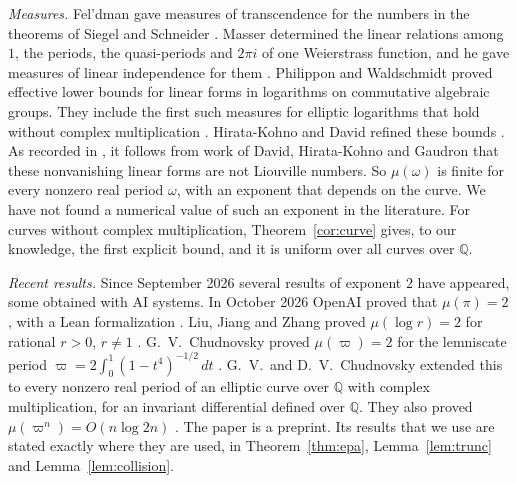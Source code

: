 \documentclass[11pt]{amsart}
\theoremstyle{definition}
\theoremstyle{remark}
\numberwithin{equation}{section}
\newcommand{\Q}{\mathbb Q}
\newcommand{\CM}{\cite{ChudnovskyChudnovsky26}}
\begin{document}
\emph{Measures.} Fel'dman gave measures of transcendence for the numbers in the theorems of Siegel and Schneider
\cite{Feldman51,Feldman74}. Masser determined the linear relations among $1$, the periods, the quasi-periods and
$2\pi i$ of one Weierstrass function, and he gave measures of linear independence for them \cite{Masser75}.
Philippon and Waldschmidt proved effective lower bounds for linear forms in logarithms on commutative algebraic
groups. They include the first such measures for elliptic logarithms that hold without complex multiplication
\cite{PhilipponWaldschmidt88,PhilipponWaldschmidt89}. Hirata-Kohno and David refined these bounds
\cite{HirataKohno90,HirataKohno91,David95}. As recorded in \cite[Section~4.3]{Waldschmidt08}, it follows from
work of David, Hirata-Kohno and Gaudron that these nonvanishing linear forms are not Liouville numbers. So
$\mu(\omega)$ is finite for every nonzero real period $\omega$, with an exponent that depends on the curve. We
have not found a numerical value of such an exponent in the literature. For curves without complex
multiplication, Theorem~\ref{cor:curve} gives, to our knowledge, the first explicit bound, and it is uniform over
all curves over $\Q$.

\emph{Recent results.} Since September 2026 several results of exponent $2$ have appeared, some obtained with AI
systems. In October 2026 OpenAI proved that $\mu(\pi)=2$, with a Lean formalization \cite{OpenAIPi2026}.
Liu, Jiang and Zhang proved $\mu(\log r)=2$ for rational $r>0$, $r\ne1$ \cite{LiuJiangZhang26}.
G.~V.~Chudnovsky proved $\mu(\varpi)=2$ for the lemniscate period
$\varpi=2\int_0^1(1-t^4)^{-1/2}\,dt$ \cite{Chudnovsky26}. G.~V.~and D.~V.~Chudnovsky extended this to every
nonzero real period of an elliptic curve over $\Q$ with complex multiplication, for an invariant differential
defined over $\Q$. They also proved $\mu(\varpi^n)=O(n\log 2n)$ \CM. The paper \CM{} is a preprint. Its results
that we use are stated exactly where they are used, in Theorem~\ref{thm:epa}, Lemma~\ref{lem:trunc} and
Lemma~\ref{lem:collision}.
\end{document}
